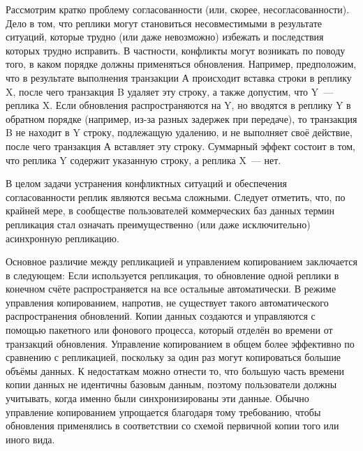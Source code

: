 Рассмотрим кратко проблему согласованности (или, скорее, несогласованности).
Дело в том, что реплики могут становиться несовместимыми в результате ситуаций, которые трудно (или даже
невозможно) избежать и последствия которых трудно исправить.
В частности, конфликты могут возникать по поводу того, в каком порядке должны применяться обновления.
Например, предположим, что в результате выполнения транзакции А происходит вставка строки в реплику X,
после чего транзакция B удаляет эту строку, а также допустим, что Y~--- реплика X. Если обновления распространяются на Y,
но вводятся в реплику Y в обратном порядке (например, из-за разных задержек при передаче), то транзакция B не находит в Y
строку, подлежащую удалению, и не выполняет своё действие, после чего транзакция А вставляет эту строку. Суммарный эффект
состоит в том, что реплика Y содержит указанную строку, а реплика X~--- нет.

В целом задачи устранения конфликтных ситуаций и обеспечения согласованности реплик являются весьма сложными.
Следует отметить, что, по крайней мере, в сообществе пользователей коммерческих баз данных термин репликация стал означать
преимущественно (или даже исключительно) асинхронную репликацию.

Основное различие между репликацией и управлением копированием заключается в следующем:
Если используется репликация, то обновление одной реплики в конечном счёте распространяется на все остальные автоматически.
В режиме управления копированием, напротив, не существует такого автоматического распространения обновлений.
Копии данных создаются и управляются с помощью пакетного или фонового процесса, который отделён во времени от транзакций обновления.
Управление копированием в общем более эффективно по сравнению с репликацией, поскольку за один раз могут копироваться
большие объёмы данных. К недостаткам можно отнести то, что большую часть времени копии данных не идентичны базовым данным,
поэтому пользователи должны учитывать, когда именно были синхронизированы эти данные.
Обычно управление копированием упрощается благодаря тому требованию, чтобы обновления применялись в соответствии со
схемой первичной копии того или иного вида.

